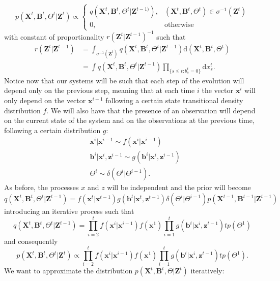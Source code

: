 \documentclass[11pt,a4paper]{article}
\renewcommand{\vec}[1]{\mathbf{#1}}
\newcommand{\D}{\mathrm{d}}
\begin{document}
\begin{equation*}
    p(\vec{X}^t, \vec{B}^t, \Theta^t |\vec{Z}^t) \propto 
    \begin{cases}
        q(\vec{X}^t, \vec{B}^t, \Theta^t | \vec{Z}^{t-1)}), & (\vec{X}^t, \vec{B}^t, \Theta^t) \in \sigma^{-1}(\vec{Z}^t) \\
        0, & \text{otherwise}
    \end{cases}
\end{equation*}
with constant of proportionality $r(\vec{Z}^t | \vec{Z}^{t-1})^{-1}$ such that
\begin{align*}
    r(\vec{Z}^t | \vec{Z}^{t-1}) &= \int_{\sigma^{-1}(\vec{Z}^t)} q (\vec{X}^t, \vec{B}^t, \Theta^t | \vec{Z}^{t-1}) \D (\vec{X}^t, \vec{B}^t, \Theta^t)\\
    &= \int q(\vec{X}^t, \vec{B}^t, \Theta^t | \vec{Z}^{t-1}) \prod_{ \{ s \leq t:b^t_s = 0 \} } \D x_s^t.
\end{align*}
Notice now that our systems will be such that each step of the evolution will depend only on the previous step, meaning that at each time $i$ the vector $\vec{x}^i$ will only depend on the vector $\vec{x}^{i-1}$ following a certain state transitional density distribution $f$. We will also have that the presence of an observation will depend on the current state of the system and on the observations at the previous time, following a certain distribution $g$:
\begin{align*}
    &\vec{x}^i | \vec{x}^{i-1} \sim f(\vec{x}^i | \vec{x}^{i-1})\\
    &\vec{b}^i | \vec{x}^i, \vec{z}^{i-1} \sim g(\vec{b}^i | \vec{x}^i, \vec{z}^{i-1})\\
    & \Theta^i \sim \delta (\Theta^i | \Theta^{i-1}).
\end{align*}
As before, the processes $x$ and $z$ will be independent and the prior will become 
\begin{equation*}
    q(\vec{X}^t, \vec{B}^t, \Theta^t | \vec{Z}^{t-1}) = f(\vec{x}^t | \vec{x}^{t-1}) g(\vec{b}^t | \vec{x}^t, \vec{z}^{t-1}) \delta (\Theta^i | \Theta^{i-1}) p(\vec{X}^{t-1}, \vec{B}^{t-1} | \vec{Z}^{t-1})
\end{equation*}
introducing an iterative process such that
\begin{equation*}
    q(\vec{X}^t, \vec{B}^t , \Theta^t| \vec{Z}^{t-1}) = \prod_{i=2}^t f(\vec{x}^i | \vec{x}^{i-1}) f(\vec{x}^1) \prod_{i=1}^t g(\vec{b}^i | \vec{x}^i, \vec{z}^{t-1}) t p(\Theta^1)
\end{equation*}
and consequently
\begin{equation*}
    p(\vec{X}^t, \vec{B}^t, \Theta^t | \vec{Z}^t) \propto \prod_{i=2}^t f(\vec{x}^i | \vec{x}^{i-1}) f(\vec{x}^1) \prod_{i=1}^t g(\vec{b}^i | \vec{x}^i, \vec{z}^{t-1}) t p(\Theta^1).
\end{equation*}
We want to approximate the distribution $p(\vec{X}^{t}, \vec{B}^{t}, \Theta| \vec{Z}^{t})$ iteratively:
\end{document}
